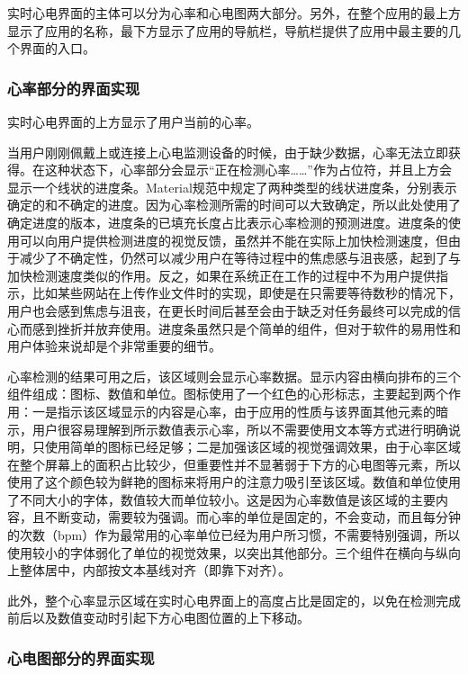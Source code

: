 实时心电界面的主体可以分为心率和心电图两大部分。另外，在整个应用的最上方显示了应用的名称，最下方显示了应用的导航栏，导航栏提供了应用中最主要的几个界面的入口。

\subsubsection{心率部分的界面实现}\label{subsubsec:heart-rate-ui}

实时心电界面的上方显示了用户当前的心率。

当用户刚刚佩戴上或连接上心电监测设备的时候，由于缺少数据，心率无法立即获得。在这种状态下，心率部分会显示“正在检测心率……”作为占位符，并且上方会显示一个线状的进度条。Material规范中规定了两种类型的线状进度条，分别表示确定的和不确定的进度。因为心率检测所需的时间可以大致确定，所以此处使用了确定进度的版本，进度条的已填充长度占比表示心率检测的预测进度。进度条的使用可以向用户提供检测进度的视觉反馈，虽然并不能在实际上加快检测速度，但由于减少了不确定性，仍然可以减少用户在等待过程中的焦虑感与沮丧感，起到了与加快检测速度类似的作用。反之，如果在系统正在工作的过程中不为用户提供指示，比如某些网站在上传作业文件时的实现，即使是在只需要等待数秒的情况下，用户也会感到焦虑与沮丧，在更长时间后甚至会由于缺乏对任务最终可以完成的信心而感到挫折并放弃使用。进度条虽然只是个简单的组件，但对于软件的易用性和用户体验来说却是个非常重要的细节。

心率检测的结果可用之后，该区域则会显示心率数据。显示内容由横向排布的三个组件组成：图标、数值和单位。图标使用了一个红色的心形标志，主要起到两个作用：一是指示该区域显示的内容是心率，由于应用的性质与该界面其他元素的暗示，用户很容易理解到所示数值表示心率，所以不需要使用文本等方式进行明确说明，只使用简单的图标已经足够；二是加强该区域的视觉强调效果，由于心率区域在整个屏幕上的面积占比较少，但重要性并不显著弱于下方的心电图等元素，所以使用了这个颜色较为鲜艳的图标来将用户的注意力吸引至该区域。数值和单位使用了不同大小的字体，数值较大而单位较小。这是因为心率数值是该区域的主要内容，且不断变动，需要较为强调。而心率的单位是固定的，不会变动，而且每分钟的次数（bpm）作为最常用的心率单位已经为用户所习惯，不需要特别强调，所以使用较小的字体弱化了单位的视觉效果，以突出其他部分。三个组件在横向与纵向上整体居中，内部按文本基线对齐（即靠下对齐）。

此外，整个心率显示区域在实时心电界面上的高度占比是固定的，以免在检测完成前后以及数值变动时引起下方心电图位置的上下移动。

\subsubsection{心电图部分的界面实现}\label{subsubsec:ecg-ui}

